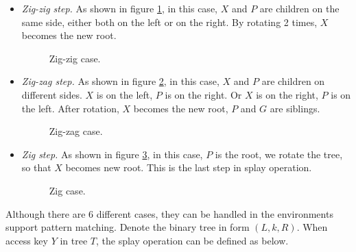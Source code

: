 \documentclass[UTF8]{article}
\begin{document}
\begin{itemize}
\item {\em Zig-zig step.} As shown in figure \ref{fig:zig-zig}, in this case,
$X$ and $P$ are children on the same side, either both on the left or on the right. By
rotating 2 times, $X$ becomes the new root.

\begin{figure}[htbp]
  \centering
  \caption{Zig-zig case.} \label{fig:zig-zig}
\end{figure}

\item {\em Zig-zag step.} As shown in figure \ref{fig:zig-zag}, in this
case, $X$ and $P$ are children on different sides. $X$ is on the left,
$P$ is on the right. Or $X$ is on the right, $P$ is on the left.
After rotation, $X$ becomes the new root, $P$ and $G$ are siblings.

\begin{figure}[htbp]
  \centering
  \caption{Zig-zag case.} \label{fig:zig-zag}
\end{figure}

\item {\em Zig step.} As shown in figure \ref{fig:zig}, in this case,
$P$ is the root, we rotate the tree, so that $X$ becomes new root.
This is the last step in splay operation.

\begin{figure}[htbp]
  \centering
  \caption{Zig case.} \label{fig:zig}
\end{figure}

\end{itemize}

Although there are 6 different cases, they can be handled in the
environments support pattern matching. Denote the binary tree
in form $(L, k, R)$. When access key $Y$ in tree $T$, the splay
operation can be defined as below.
\end{document}

